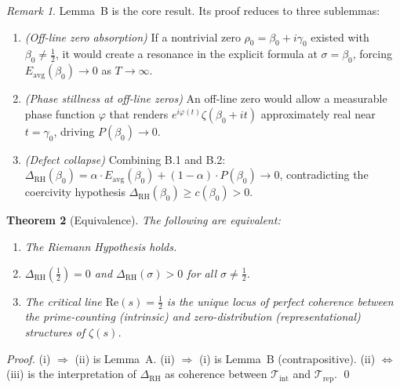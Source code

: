 \documentclass[11pt]{article}
\newtheorem{theorem}{Theorem}[section]
\theoremstyle{remark}
\newtheorem{remark}[theorem]{Remark}
\begin{document}
\begin{remark}
Lemma~B is the core result. Its proof reduces to three sublemmas:
\begin{enumerate}
  \item[\textbf{B.1}] \emph{(Off-line zero absorption)} If a nontrivial zero $\rho_0 = \beta_0 + i\gamma_0$ existed with $\beta_0 \neq \tfrac{1}{2}$, it would create a resonance in the explicit formula at $\sigma = \beta_0$, forcing $E_{\mathrm{avg}}(\beta_0) \to 0$ as $T \to \infty$.
  \item[\textbf{B.2}] \emph{(Phase stillness at off-line zeros)} An off-line zero would allow a measurable phase function $\varphi$ that renders $e^{i\varphi(t)} \zeta(\beta_0 + it)$ approximately real near $t = \gamma_0$, driving $P(\beta_0) \to 0$.
  \item[\textbf{B.3}] \emph{(Defect collapse)} Combining B.1 and B.2: $\Delta_{\mathrm{RH}}(\beta_0) = \alpha \cdot E_{\mathrm{avg}}(\beta_0) + (1-\alpha) \cdot P(\beta_0) \to 0$, contradicting the coercivity hypothesis $\Delta_{\mathrm{RH}}(\beta_0) \geq c(\beta_0) > 0$.
\end{enumerate}
\end{remark}


\begin{theorem}[Equivalence]
\label{thm:rh-equiv}
The following are equivalent:
\begin{enumerate}
  \item[(i)] The Riemann Hypothesis holds.
  \item[(ii)] $\Delta_{\mathrm{RH}}(\tfrac{1}{2}) = 0$ and $\Delta_{\mathrm{RH}}(\sigma) > 0$ for all $\sigma \neq \tfrac{1}{2}$.
  \item[(iii)] The critical line $\mathrm{Re}(s) = \tfrac{1}{2}$ is the unique locus of perfect coherence between the prime-counting (intrinsic) and zero-distribution (representational) structures of $\zeta(s)$.
\end{enumerate}
\end{theorem}

\begin{proof}
(i) $\Rightarrow$ (ii) is Lemma~A. (ii) $\Rightarrow$ (i) is Lemma~B (contrapositive). (ii) $\Leftrightarrow$ (iii) is the interpretation of $\Delta_{\mathrm{RH}}$ as coherence between $\mathcal{T}_{\mathrm{int}}$ and $\mathcal{T}_{\mathrm{rep}}$. \qed
\end{proof}

\end{document}

